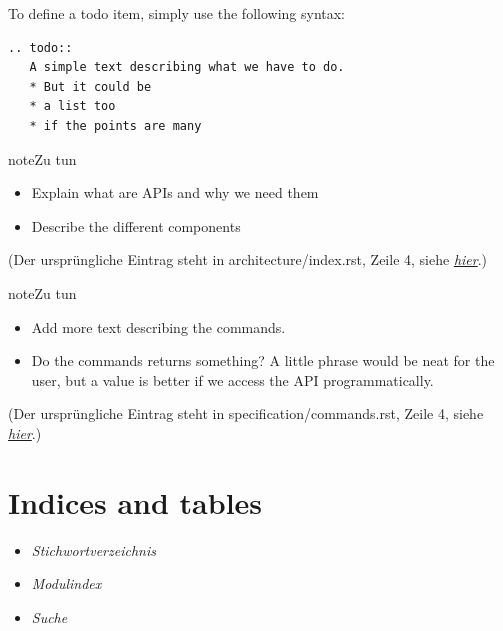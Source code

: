 \documentclass[letterpaper,10pt,ngerman]{manual}
\begin{document}
To define a todo item, simply use the following syntax:

\begin{Verbatim}[commandchars=@\[\]]
.. todo::
   A simple text describing what we have to do.
   * But it could be
   * a list too
   * if the points are many
\end{Verbatim}

\begin{notice}{note}{Zu tun}
\begin{itemize}
\item {} 
Explain what are APIs and why we need them

\item {} 
Describe the different components

\end{itemize}
\end{notice}

(Der ursprüngliche Eintrag steht in architecture/index.rst, Zeile 4, siehe \hyperlink{todo-0}{\emph{hier}}.)

\begin{notice}{note}{Zu tun}
\begin{itemize}
\item {} 
Add more text describing the commands.

\item {} 
Do the commands returns something? A little phrase would be neat for the
user, but a value is better if we access the API programmatically.

\end{itemize}
\end{notice}

(Der ursprüngliche Eintrag steht in specification/commands.rst, Zeile 4, siehe \hyperlink{todo-1}{\emph{hier}}.)


\chapter{Indices and tables}
\begin{itemize}
\item {} 
\emph{Stichwortverzeichnis}

\item {} 
\emph{Modulindex}

\item {} 
\emph{Suche}

\end{itemize}


\renewcommand{\indexname}{Modulindex}
\printmodindex
\renewcommand{\indexname}{Stichwortverzeichnis}
\printindex
\end{document}
